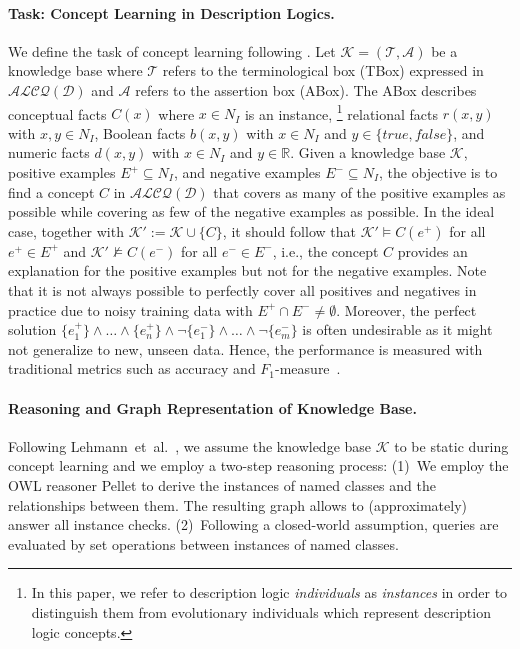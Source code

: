 \paragraph{Task: Concept Learning in Description Logics.}
We define the task of concept learning following \citet{Lehmann2010Concept}. Let $\mathcal{K}=(\mathcal{T}, \mathcal{A})$ be a knowledge base where $\mathcal{T}$ refers to the terminological box (TBox) expressed in $\mathcal{ALCQ(D)}$ and $\mathcal{A}$ refers to the assertion box (ABox). The ABox describes
conceptual facts $C(x)$ where $x \in N_I$ is an instance,%
\footnote{In this paper, we refer to description logic \emph{individuals} as \emph{instances} in order to distinguish them from evolutionary individuals which represent description logic concepts.}
relational facts $r(x, y)$ with $x,y \in N_I$,
Boolean facts $b(x, y)$ with $x \in N_I$ and $y \in \{\mathit{true}, \mathit{false}\}$,
and numeric facts $d(x, y)$ with $x \in N_I$ and $y \in \mathbb{R}.$
Given a knowledge base $\mathcal{K}$, positive examples $E^+\subseteq N_I$, and negative examples $E^- \subseteq N_I$, the objective is to find a concept $C$ in $\mathcal{ALCQ(D)}$ that covers as many of the positive examples as possible while covering as few of the negative examples as possible. In the ideal case, together with $\mathcal{K}' := \mathcal{K} \cup \{ C \}$, it should follow that $\mathcal{K}' \models C(e^+)$ for all $ e^+ \in E^+$ and $\mathcal{K'} \not\models C(e^-)$ for all $e^- \in E^-$, i.e., the concept $C$ provides an explanation for the positive examples but not for the negative examples. Note that it is not always possible to perfectly cover all positives and negatives in practice due to noisy training data with $E^{+} \cap E^{-}\neq \emptyset$. Moreover, the perfect solution $\{e_1^+\} \wedge  \ldots \wedge \{e_n^+ \} \wedge \neg \{e_1^-\}\wedge \ldots \wedge \neg \{e_m^-\}$ is often undesirable as it might not generalize to new, unseen data. Hence, the performance is measured with traditional metrics such as accuracy and $F_1$-measure~\citep{Westphal2019SML-Bench}.

\paragraph{Reasoning and Graph Representation of Knowledge Base.}
Following Lehmann~et~al.~\cite{Lehmann2010Concept,Lehmann2011Class}, we assume the knowledge base $\mathcal{K}$ to be static during concept learning and we employ a two-step reasoning process: (1)~We employ the OWL reasoner Pellet to derive the instances of named classes and the relationships between them. The resulting graph allows to (approximately) answer all instance checks.
(2)~Following a closed-world assumption, queries are evaluated by set operations between instances of named classes.


